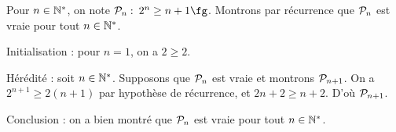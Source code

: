 \begin{sol}
Pour $n\in\mathbb{N}^*$, on note ${\cal P}_n :$ \og $2^n\ge n+1\fg$. Montrons par récurrence
que ${\cal P}_n$ est vraie pour tout $n\in\mathbb{N}^*$.

Initialisation : pour $n=1$, on a $2\ge 2$.

Hérédité : soit $n\in\mathbb{N}^*$. Supposons que ${\cal P}_n$ est vraie et 
montrons ${\cal P}_{n+1}$. On a $2^{n+1}\ge 2(n+1)$ par hypothèse de récurrence,
et $2n+2\ge n+2$. D'où ${\cal P}_{n+1}$.

Conclusion : on a bien montré que ${\cal P}_n$ est vraie pour tout $n\in\mathbb{N}^*$.
\end{sol}
